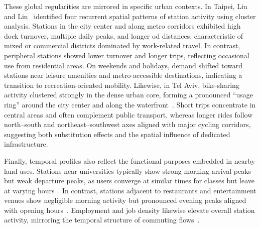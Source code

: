     These global regularities are mirrored in specific urban contexts. In Taipei, Liu and Lin~\cite{Liu2019} identified four recurrent spatial patterns of station activity using cluster analysis. Stations in the city center and along metro corridors exhibited high dock turnover, multiple daily peaks, and longer \ac{od} distances, characteristic of mixed or commercial districts dominated by work-related travel. In contrast, peripheral stations showed lower turnover and longer trips, reflecting occasional use from residential areas. On weekends and holidays, demand shifted toward stations near leisure amenities and metro-accessible destinations, indicating a transition to recreation-oriented mobility. Likewise, in Tel Aviv, bike-sharing activity clustered strongly in the dense urban core, forming a pronounced “usage ring” around the city center and along the waterfront~\cite{Levy2019}. Short trips concentrate in central areas and often complement public transport, whereas longer rides follow north–south and northeast–southwest axes aligned with major cycling corridors, suggesting both substitution effects and the spatial influence of dedicated infrastructure.


    Finally, temporal profiles also reflect the functional purposes embedded in nearby land uses. Stations near universities typically show strong morning arrival peaks but weak departure peaks, as users converge at similar times for classes but leave at varying hours~\cite{FaghihImani2014}. In contrast, stations adjacent to restaurants and entertainment venues show negligible morning activity but pronounced evening peaks aligned with opening hours~\cite{FaghihImani2016}. Employment and job density likewise elevate overall station activity, mirroring the temporal structure of commuting flows~\cite{Tran2015, Chen2021_Identifying}.
